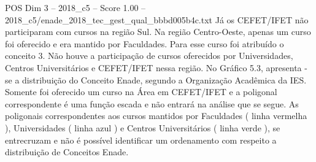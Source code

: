 \begin{textsample}{POS Dim 3 – 2018\_c5 – Score 1.00 – 2018\_c5/enade\_2018\_tec\_gest\_qual\_bbbd005b4c.txt}
Já os CEFET/IFET não participaram com cursos na região Sul.
Na região Centro-Oeste, apenas um curso foi oferecido e era mantido por Faculdades.
Para esse curso foi atribuído o conceito 3.
Não houve a participação de cursos oferecidos por Universidades, Centros Universitários e CEFET/IFET nessa região.
No Gráfico 5.3, apresenta -se a distribuição do Conceito Enade, segundo a Organização Acadêmica da IES.
Somente foi oferecido um curso na Área em CEFET/IFET e a poligonal correspondente é uma função escada e não entrará na análise que se segue.
As poligonais correspondentes aos cursos mantidos por Faculdades ( linha vermelha ), Universidades ( linha azul ) e Centros Universitários ( linha verde ), se entrecruzam e não é possível identificar um ordenamento com respeito a distribuição de Conceitos Enade.

\end{textsample}
